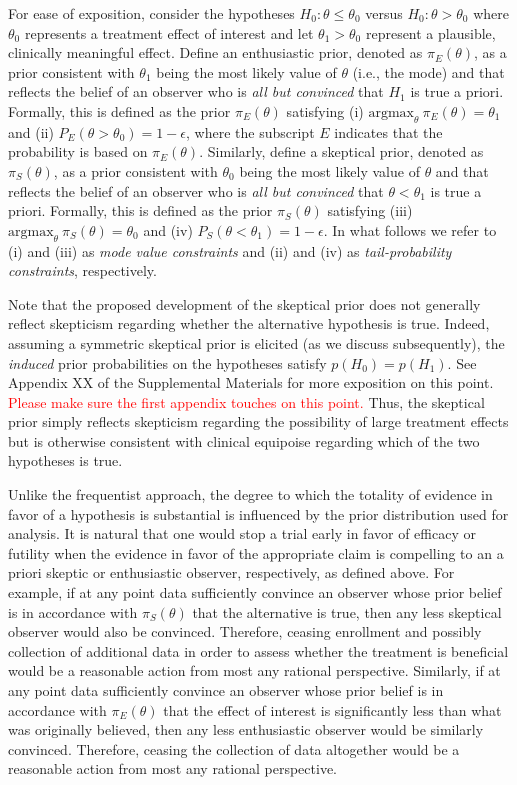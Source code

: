 \documentclass[useAMS,usenatbib,referee]{biom}
\begin{document}
For ease of exposition, consider the hypotheses $H_0: \theta \le \theta_0$ versus $H_0: \theta > \theta_0$ where $\theta_0$ represents a 
treatment effect of interest and let $\theta_1>\theta_0$ represent a plausible, clinically meaningful effect.
%
Define an enthusiastic prior, denoted as $\pi_{E}(\theta)$, as a prior consistent with $\theta_1$ being the most 
likely value of $\theta$ (i.e., the mode) and that reflects the belief of an observer who is 
\textit{all but convinced} that $H_1$ is true a priori. 
%
Formally, this is defined as the prior $\pi_E(\theta)$ satisfying (i) $\text{argmax}_\theta~\pi_E(\theta)=\theta_1$
and (ii) $P_E(\theta >\theta_0)=1-\epsilon$, where the subscript $E$ indicates that the probability is 
based on $\pi_{E}(\theta)$.
%
Similarly, define a skeptical prior, denoted as $\pi_{S}(\theta)$, as a prior consistent with $\theta_0$ being the most 
likely value of $\theta$ and that reflects the belief of an observer who is \textit{all but convinced} that 
$\theta <\theta_1$ is true a priori. 
%
Formally, this is defined as the prior $\pi_{S}(\theta)$ satisfying
(iii) $\text{argmax}_\theta~\pi_S(\theta)=\theta_0$  and (iv) $P_S(\theta <\theta_1)=1-\epsilon$.
%
In what follows we refer to (i) and (iii) as \textit{mode value constraints} and (ii) and (iv) as \textit{tail-probability constraints}, respectively.

Note that the proposed development of the skeptical prior does not generally reflect skepticism regarding whether the alternative hypothesis is true. 
%
Indeed, assuming a symmetric skeptical prior is elicited (as we discuss subsequently), the \textit{induced} prior probabilities on the hypotheses
satisfy $p(H_0) =  p(H_1)$.
%
See Appendix XX of the Supplemental Materials for more exposition on this point.
%
\textcolor{red}{Please make sure the first appendix touches on this point.}
%
Thus, the skeptical prior simply reflects skepticism regarding the possibility of large treatment effects but is
otherwise consistent with clinical equipoise regarding which of the two hypotheses is true.
%

Unlike the frequentist approach, the degree to which the totality of evidence in favor of a hypothesis is substantial is influenced by 
the prior distribution used for analysis.
%
It is natural that one would stop a trial early in favor of efficacy or futility when the evidence in favor of the appropriate claim is compelling
to an a priori skeptic or enthusiastic observer, respectively, as defined above.
%
For example, if at any point data sufficiently convince an observer whose prior belief is in accordance with $\pi_{S}(\theta)$ that 
the alternative is true, then any less skeptical observer would also be convinced. Therefore, ceasing enrollment and possibly collection 
of additional data in order to assess whether the treatment is beneficial would be a reasonable action from most any rational perspective.
%
Similarly, if at any point data sufficiently convince an observer whose prior belief is in accordance with $\pi_{E}(\theta)$ that 
the effect of interest is significantly less than what was originally believed, then any less enthusiastic observer would be similarly convinced.
Therefore, ceasing the collection of data altogether would be a reasonable action from most any rational perspective.
\end{document}
